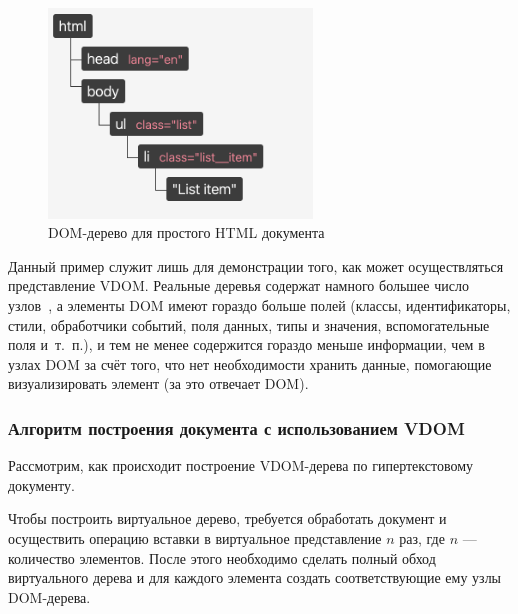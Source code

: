 \begin{figure}[h]
	\centering
	\includegraphics[width=70mm]{img/dom-to-vdom-dom.png}
	\caption{DOM-дерево для простого HTML документа}
	\label{fig:dom-to-vdom-dom}
\end{figure}

\clearpage


Данный пример служит лишь для демонстрации того, как может осуществляться представление VDOM. 
Реальные деревья содержат намного большее число узлов~\cite{dom-element}, а элементы DOM имеют гораздо больше полей (классы, идентификаторы, стили, обработчики событий, поля данных, типы и значения, вспомогательные поля и~т.~п.), и тем не менее содержится гораздо меньше информации, чем в узлах DOM за счёт того, что нет необходимости хранить данные, помогающие визуализировать элемент (за это отвечает DOM).

\subsubsection{Алгоритм построения документа с использованием VDOM}

Рассмотрим, как происходит построение VDOM-дерева по гипертекстовому документу.

Чтобы построить виртуальное дерево, требуется обработать документ и осуществить операцию вставки в виртуальное представление $n$ раз, где $n$ --- количество элементов. 
После этого необходимо сделать полный обход виртуального дерева и для каждого элемента создать соответствующие ему узлы DOM-дерева.

